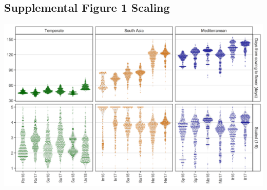 \documentclass[
]{article}
\begin{document}
\hypertarget{supplemental-figure-1-scaling}{%
\subsection{Supplemental Figure 1
Scaling}\label{supplemental-figure-1-scaling}}

\includegraphics{Supplemental_Figure_01.png}
\end{document}
